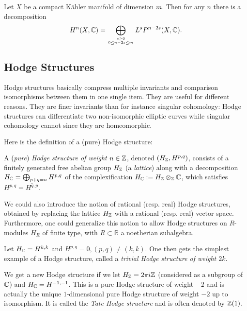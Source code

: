 \documentclass[../main.tex]{subfiles}
\begin{document}
\begin{theorem} \textup{\cite[Cor. 6.26]{Voi07}} 
\label{LefDec}
Let $X$ be a compact K\"{a}hler manifold of dimension $m$. Then for any $n$ there is a decomposition
\[H^n(X,\mathbb{C}) = \bigoplus_{s \geq 0 \atop 0 \leq n-2s \leq m} L^sP^{n-2s}(X,\mathbb{C}).\]
\end{theorem}

\subsection{Hodge Structures}    

Hodge structures basically compress multiple invariants and comparison isomorphisms between them in one single item.
They are useful for different reasons. They are finer invariants than for instance singular cohomology: Hodge structures can differentiate two non-isomorphic elliptic curves while singular cohomology cannot since they are homeomorphic.

Here is the definition of a (pure) Hodge structure:

\begin{defn} A (\emph{pure}) \emph{Hodge structure of weight $n \in \mathbb{Z}$}, denoted $(H_{\mathbb{Z}},H^{p,q})$, consists of a finitely generated free abelian group $H_{\mathbb{Z}}$ (a \emph{lattice}) along with a decomposition $H_{\mathbb{C}} = \bigoplus_{p+q = n} H^{p,q}$ of the complexification  $H_{\mathbb{C}} := H_{\mathbb{Z}} \otimes_{\mathbb{Z}} \mathbb{C}$, which satisfies $H^{p,q} = \overline{H^{q,p}}$.
\end{defn}

We could also introduce the notion of rational (resp. real) Hodge structures, obtained by replacing the lattice $H_{\mathbb{Z}}$ with a rational (resp. real) vector space. Furthermore, one could generalize this notion to allow Hodge structures on $R$-modules $H_R$ of finite type, with $R \subset \mathbb{R}$ a noetherian subalgebra. 

\begin{es}
Let $H_{\mathbb{C}} = H^{k,k}$ and $H^{p,q} = 0, (p, q) \neq (k, k)$. One then gets the simplest example of a Hodge structure, called a \emph{trivial Hodge structure of weight $2k$}.
\end{es}

\begin{es} We get a new Hodge structure if we let $H_{\mathbb{Z}} = 2\pi i \mathbb{Z}$ (considered as a subgroup of $\mathbb{C}$) and $H_{\mathbb{C}} = H^{-1,-1}$. This is a pure Hodge structure of weight $-2$ and is actually the unique $1$-dimensional pure Hodge structure of weight $-2$ up to isomorphism. It is called the \emph{Tate Hodge structure} and is often denoted by $\mathbb{Z} (1)$.
\end{es}
\end{document}
